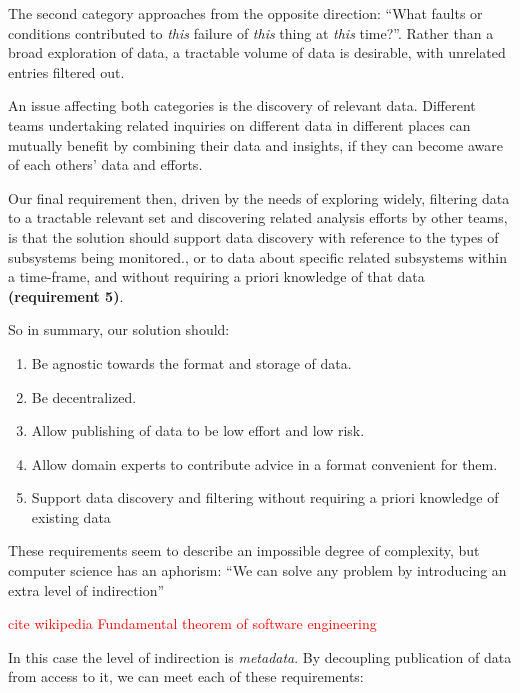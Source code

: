 The second category approaches from the opposite direction: ``What 
faults or conditions contributed to \emph{this} failure of \emph{this} 
thing at \emph{this} time?''. Rather than a broad exploration of data, 
a tractable volume of data is desirable, with unrelated entries 
filtered out. 

An issue affecting both categories is the discovery of relevant data. 
Different teams undertaking related inquiries on different data 
in different places can mutually benefit by combining their data and
insights, if they can become aware of each others' data and efforts. 

Our final requirement then, driven by the needs of exploring widely,
filtering data to a tractable relevant set and discovering related 
analysis efforts by other teams, is that the solution should support 
data discovery with reference to the types of subsystems being 
monitored., or to data about specific related subsystems within a
time-frame, and without requiring a priori knowledge of that data
\textbf{(requirement 5)}.

So in summary, our solution should:
\begin{enumerate}
\item Be agnostic towards the format and storage of data.
\item Be decentralized.
\item Allow publishing of data to be low effort and low risk.
\item Allow domain experts to contribute advice in a format convenient for them.
\item Support data discovery and filtering without requiring a 
      priori knowledge of existing data
\end{enumerate}

      
      
 These requirements seem to describe an impossible degree of complexity, but 
computer science has an aphorism: ``We can solve any problem by introducing an extra level of indirection'' 

 \textcolor{red}{cite wikipedia Fundamental theorem of software engineering}

In this case the level of indirection is \emph{metadata}. By decoupling 
publication of data from access to it, we can meet each of these 
requirements:

